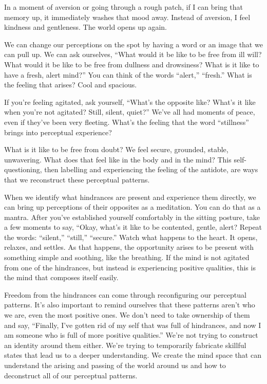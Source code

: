 In a moment of aversion or going through a rough patch, if I can bring that memory up, it immediately washes that mood away. Instead of aversion, I feel kindness and gentleness. The world opens up again.

We can change our perceptions on the spot by having a word or an image that we can pull up. We can ask ourselves, ``What would it be like to be free from ill will? What would it be like to be free from dullness and drowsiness? What is it like to have a fresh, alert mind?'' You can think of the words ``alert,'' ``fresh.'' What is the feeling that arises? Cool and spacious.~

If you're feeling agitated, ask yourself, ``What's the opposite like? What's it like when you're not agitated? Still, silent, quiet?'' We've all had moments of peace, even if they've been very fleeting. What's the feeling that the word ``stillness'' brings into perceptual experience?~

What is it like to be free from doubt? We feel secure, grounded, stable, unwavering. What does that feel like in the body and in the mind? This self-questioning, then labelling and experiencing the feeling of the antidote, are ways that we reconstruct these perceptual patterns.

When we identify what hindrances are present and experience them directly, we can bring up perceptions of their opposites as a meditation. You can do that as a mantra. After you've established yourself comfortably in the sitting posture, take a few moments to say, ``Okay, what's it like to be contented, gentle, alert? Repeat the words: ``silent,'' ``still,'' ``secure.'' Watch what happens to the heart. It opens, relaxes, and settles. As that happens, the opportunity arises to be present with something simple and soothing, like the breathing. If the mind is not agitated from one of the hindrances, but instead is experiencing positive qualities, this is the mind that composes itself easily.

Freedom from the hindrances can come through reconfiguring our perceptual patterns. It's also important to remind ourselves that these patterns aren't who we are, even the most positive ones. We don't need to take ownership of them and say, ``Finally, I've gotten rid of my self that was full of hindrances, and now I am someone who is full of more positive qualities.'' We're not trying to construct an identity around them either. We're trying to temporarily fabricate skillful states that lead us to a deeper understanding. We create the mind space that can understand the arising and passing of the world around us and how to deconstruct all of our perceptual patterns.

